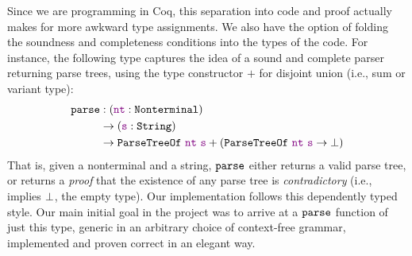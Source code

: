       Since we are programming in Coq, this separation into code and proof actually makes for more awkward type assignments.  We also have the option of folding the soundness and completeness conditions into the types of the code.  For instance, the following type captures the idea of a sound and complete parser returning parse trees, using the type constructor $+$ for disjoint union (i.e., sum or variant type):
      \begin{align*}
        \fname{parse} & \oftypesep
        (\oftype{\farg{nt}}{\Nonterminal}) \\
        & \typeto (\oftype{\farg{s}}{\String}) \\
        & \typeto \indname{ParseTreeOf}~\farg{nt}~\farg{s} + (\indname{ParseTreeOf}~\farg{nt}~\farg{s} \typeto \False)
      \end{align*}
      That is, given a nonterminal and a string, $\texttt{parse}$ either returns a valid parse tree, or returns a \emph{proof} that the existence of any parse tree is \emph{contradictory} (i.e., implies $\bot$, the empty type).  Our implementation follows this dependently typed style.  Our main initial goal in the project was to arrive at a $\texttt{parse}$ function of just this type, generic in an arbitrary choice of context-free grammar, implemented and proven correct in an elegant way.
  